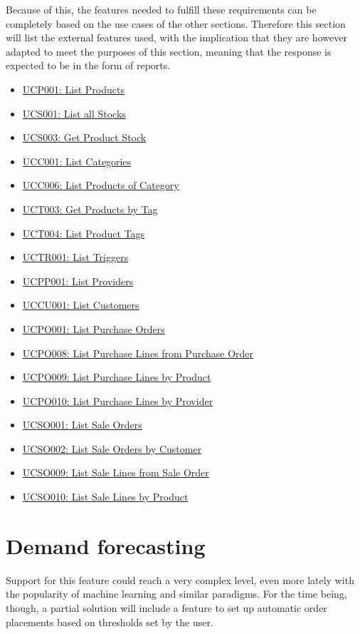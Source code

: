 Because of this, the features needed to fulfill these requirements can be completely based on the use cases of the other sections. Therefore this section will list the external features used, with the implication that they are however adapted to meet the purposes of this section, meaning that the response is expected to be in the form of reports.
\hfill\break
\begin{itemize}
\item \hyperref[UCP001]{UCP001: List Products}
\item \hyperref[UCS001]{UCS001: List all Stocks}
\item \hyperref[UCS003]{UCS003: Get Product Stock}
\item \hyperref[UCC001]{UCC001: List Categories}
\item \hyperref[UCC006]{UCC006: List Products of Category}
\item \hyperref[UCT003]{UCT003: Get Products by Tag}
\item \hyperref[UCT004]{UCT004: List Product Tags}
\item \hyperref[UCTR001]{UCTR001: List Triggers}
\item \hyperref[UCPP001]{UCPP001: List Providers}
\item \hyperref[UCCU001]{UCCU001: List Customers}
\item \hyperref[UCPO001]{UCPO001: List Purchase Orders}
\item \hyperref[UCPO008]{UCPO008: List Purchase Lines from Purchase Order}
\item \hyperref[UCPO009]{UCPO009: List Purchase Lines by Product}
\item \hyperref[UCPO010]{UCPO010: List Purchase Lines by Provider}
\item \hyperref[UCSO001]{UCSO001: List Sale Orders}
\item \hyperref[UCSO002]{UCSO002: List Sale Orders by Customer}
\item \hyperref[UCSO009]{UCSO009: List Sale Lines from Sale Order}
\item \hyperref[UCSO010]{UCSO010: List Sale Lines by Product}
\end{itemize}
\hfill\break

\section{Demand forecasting}
Support for this feature could reach a very complex level, even more lately with the popularity of machine learning and similar paradigms. For the time being, though, a partial solution will include a feature to set up automatic order placements based on thresholds set by the user.

